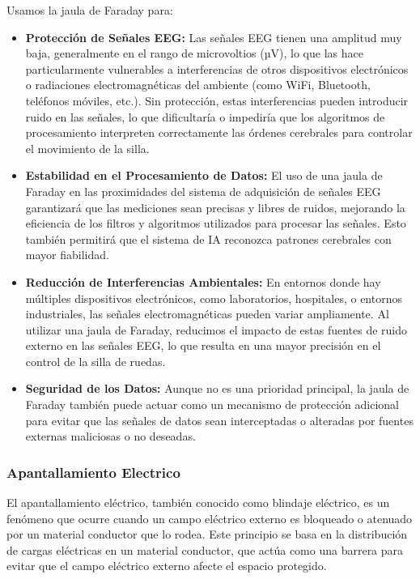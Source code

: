 \documentclass{article}
\begin{document}
Usamos la jaula de Faraday para:
\begin{itemize}
    \item \textbf{Protección de Señales EEG:} Las señales EEG tienen una amplitud muy baja, generalmente en el rango de microvoltios (µV), lo que las hace particularmente vulnerables a interferencias de otros dispositivos electrónicos o radiaciones electromagnéticas del ambiente (como WiFi, Bluetooth, teléfonos móviles, etc.). Sin protección, estas interferencias pueden introducir ruido en las señales, lo que dificultaría o impediría que los algoritmos de procesamiento interpreten correctamente las órdenes cerebrales para controlar el movimiento de la silla.
    \item \textbf{Estabilidad en el Procesamiento de Datos:} El uso de una jaula de Faraday en las proximidades del sistema de adquisición de señales EEG garantizará que las mediciones sean precisas y libres de ruidos, mejorando la eficiencia de los filtros y algoritmos utilizados para procesar las señales. Esto también permitirá que el sistema de IA reconozca patrones cerebrales con mayor fiabilidad.
    \item \textbf{Reducción de Interferencias Ambientales:} En entornos donde hay múltiples dispositivos electrónicos, como laboratorios, hospitales, o entornos industriales, las señales electromagnéticas pueden variar ampliamente. Al utilizar una jaula de Faraday, reducimos el impacto de estas fuentes de ruido externo en las señales EEG, lo que resulta en una mayor precisión en el control de la silla de ruedas.
    \item \textbf{Seguridad de los Datos:} Aunque no es una prioridad principal, la jaula de Faraday también puede actuar como un mecanismo de protección adicional para evitar que las señales de datos sean interceptadas o alteradas por fuentes externas maliciosas o no deseadas.
\end{itemize}

\subsubsection{Apantallamiento Electrico}
El apantallamiento eléctrico, también conocido como blindaje eléctrico, es un fenómeno que ocurre cuando un campo eléctrico externo es bloqueado o atenuado por un material conductor que lo rodea. Este principio se basa en la distribución de cargas eléctricas en un material conductor, que actúa como una barrera para evitar que el campo eléctrico externo afecte el espacio protegido.
\end{document}
